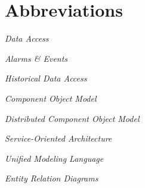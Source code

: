 % 

\chapter*{Abbreviations}
\label{sec:abbreviations}
\noindent\vspace{-\topsep-\partopsep-\parsep} %
\begin{description}[labelwidth=*]
  \item [DA] \emph{Data Access}%
  \item [A\&E] \emph{Alarms \& Events}%
  \item [HDA] \emph{Historical Data Access}%
  \item [COM] \emph{ Component Object Model }%
  \item [DCOM] \emph{Distributed Component Object Model}%
  \item [SOA] \emph{Service-Oriented Architecture}%
  \item [UML] \emph{Unified Modeling Language }%
  \item [ERD] \emph{Entity Relation Diagrams}%
\end{description}